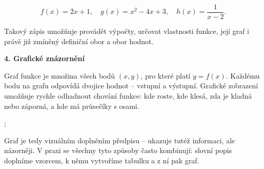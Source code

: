 \documentclass[12pt,a4paper]{article}
\begin{document}
\[
f(x) = 2x + 1, \quad g(x) = x^2 - 4x + 3, \quad h(x) = \frac{1}{x - 2}.
\]

Takový zápis umožňuje provádět výpočty, určovat vlastnosti funkce, její graf i právě již zmíněný definiční obor a obor hodnot.

\medskip
\textbf{4. Grafické znázornění}

Graf funkce je množina všech bodů \((x, y)\), pro které platí \(y = f(x)\).  
Každému bodu na grafu odpovídá dvojice hodnot – vstupní a výstupní.  
Grafické zobrazení umožňuje rychle odhadnout chování funkce: kde roste, kde klesá, zda je kladná nebo záporná, a kde má průsečíky s osami.

\begin{center}
  \begin{axisgraph}[
      grid=none,
      xmin=-2, xmax=3,
      ymin=-3, ymax=3,
      title={Graf přímky $y = 2x - 1$}
  ]
      ;
  \end{axisgraph}
\end{center}



Graf je tedy vizuálním doplněním předpisu – ukazuje tutéž informaci, ale názorněji.  
V praxi se všechny tyto způsoby často kombinují: slovní popis doplníme vzorcem, k němu vytvoříme tabulku a z ní pak graf.



%
%
%        
%        
%        
%    
\end{document}
